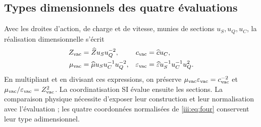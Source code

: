 \subsection{Types dimensionnels des quatre évaluations}

Avec les droites d’action, de charge et de vitesse, munies de sections
$u_S,u_Q,u_C$, la réalisation dimensionnelle s’écrit
\begin{align}
 Z_{\rm vac}&=\widehat Z u_Su_Q^{-2},&
 c_{\rm vac}&=\widehat c u_C,\\
 \mu_{\rm vac}&=\widehat\mu u_Su_C^{-1}u_Q^{-2},&
 \varepsilon_{\rm vac}&=\widehat\varepsilon u_S^{-1}u_C^{-1}u_Q^2.
 \label{iii:eq:dimensions}
\end{align}
En multipliant et en divisant ces expressions, on préserve
$\mu_{\rm vac}\varepsilon_{\rm vac}=c_{\rm vac}^{-2}$ et
$\mu_{\rm vac}/\varepsilon_{\rm vac}=Z_{\rm vac}^2$.
La coordinatisation SI évalue ensuite les sections. La comparaison physique nécessite
d’exposer leur construction et leur normalisation avec l’évaluation ; les quatre
coordonnées normalisées de \eqref{iii:eq:four} conservent leur type adimensionnel.
